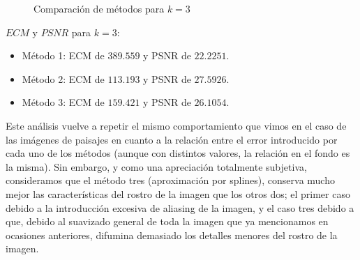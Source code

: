 \begin{figure}[H]
    \centering
    \qquad
    \qquad
    \caption{Comparación de métodos para $k = 3$}
    \label{fig:example}
\end{figure}

$ECM$ y $PSNR$ para $k = 3$:

\begin{itemize}
 \item Método 1: ECM de $389.559$ y PSNR de $22.2251$.
 \item Método 2: ECM de $113.193$ y PSNR de $27.5926$.
 \item Método 3: ECM de $159.421$ y PSNR de $26.1054$.
\end{itemize}

Este análisis vuelve a repetir el mismo comportamiento que vimos en el caso de las imágenes de paisajes en cuanto a la relación entre el error introducido por cada uno de los métodos (aunque con distintos valores, la relación en el fondo es la misma). Sin embargo, y como una apreciación totalmente subjetiva, consideramos que el método tres (aproximación por splines), conserva mucho mejor las características del rostro de la imagen que los otros dos; el primer caso debido a la introducción excesiva de aliasing de la imagen, y el caso tres debido a que, debido al suavizado general de toda la imagen que ya mencionamos en ocasiones anteriores, difumina demasiado los detalles menores del rostro de la imagen.

